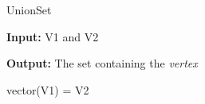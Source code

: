 \documentclass[../Head/Main.tex]{subfiles}
\begin{document}
\begin{Pseudo}{UnionSet}{}

 \textbf{Input:} V1 and V2
 
 \textbf{Output:} The set containing the \textit{vertex}
 
	\begin{Indentation}
	\item
	
	\item vector(V1) = V2
	
	\end{Indentation}

\end{Pseudo}
\end{document}
